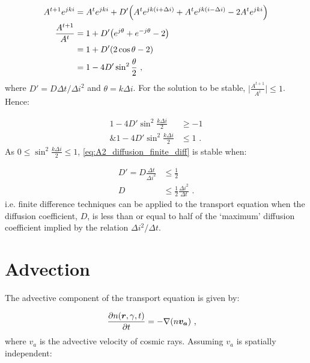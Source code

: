 \begin{equation}
    \begin{aligned}
    A^{t+1}e^{jki}&=A^te^{jki}+D'\qty(A^{t}e^{jk\qty(i+\Delta i)}+A^{t}e^{jk\qty(i-\Delta i)}-2A^te^{jki}) \\
    \frac{A^{t+1}}{A^t}&=1+D'\qty(e^{j\theta}+e^{-j\theta}-2) \\
    &=1+D'\qty(2\cos\theta-2) \\
    &=1-4D'\sin^2\frac{\theta}{2}\text{ ,} 
    \end{aligned}
\end{equation}
\noindent where $D'=D\Delta t/\Delta i^2$ and $\theta=k\Delta i$. For the solution to be stable, $\lvert \frac{A^{t+1}}{A^t}\rvert\leq 1$. Hence:

\begin{equation}
    \begin{aligned}
    1-4D'\sin^2\frac{k\Delta i}{2} &\geq -1 \\
    \text{\& } 1-4D'\sin^2\frac{k\Delta i}{2} &\leq 1 \text{ .} 
    \end{aligned} \label{eq:A2_diffusion_finite_stability_cond}
\end{equation}
\noindent As $0\leq \sin^2\frac{k\Delta i}{2}\leq 1$, \autoref{eq:A2_diffusion_finite_diff} is stable when:

\begin{equation}
    \begin{aligned}
    D'=D\frac{\Delta t}{\Delta i^2}&\leq \frac{1}{2} \\
    D&\leq \frac{1}{2}\frac{\Delta i^2}{\Delta t}\text{ .} 
    \end{aligned}
\end{equation}
\noindent i.e. finite difference techniques can be applied to the transport equation when the diffusion coefficient, $D$, is less than or equal to half of the `maximum' diffusion coefficient implied by the relation $\Delta i^2/\Delta t$.

\section{Advection}

The advective component of the transport equation is given by:

\begin{equation}
    \begin{aligned}
        \pdv{n\qty(\boldsymbol{r},\gamma,t)}{t}&=-\nabla\qty(n\boldsymbol{v_a})\text{ ,} 
    \end{aligned}
\end{equation}
\noindent where $v_a$ is the advective velocity of cosmic rays. Assuming $v_a$ is spatially independent:

